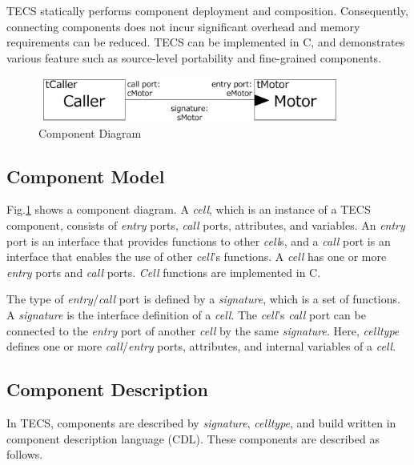 \documentclass[a4j,12pt,oneside,openany,english]{jsbook}
\begin{document}
TECS statically performs component deployment and composition.
Consequently, connecting components does not incur significant overhead and memory requirements can be reduced.
TECS can be implemented in C, and demonstrates various feature such as source-level portability and fine-grained components.

\begin{figure}[t]
    \centering
    \includegraphics[width=10cm,clip]{figure/component_diagram.pdf}
    \caption{Component Diagram}
    \label{fig:component}
\end{figure}

\subsection{Component Model}
Fig.\ref{fig:component} shows a component diagram.
A {\it cell}, which is an instance of a TECS component, consists of {\it entry} ports, {\it call} ports, attributes, and variables.
An {\it entry} port is an interface that provides functions to other {\it cell}s, and a {\it call} port is an interface that enables the use of other {\it cell}'s functions.
A {\it cell} has one or more {\it entry} ports and {\it call} ports.
{\it Cell} functions are implemented in C.

The type of {\it entry}/{\it call} port is defined by a {\it signature}, which is a set of functions.
A {\it signature} is the interface definition of a {\it cell}.
The {\it cell}'s  {\it call} port can be connected to the {\it entry} port of another {\it cell} by the same {\it signature}.
Here, {\it celltype} defines one or more {\it call}/{\it entry} ports, attributes, and internal variables of a {\it cell}.


\subsection{Component Description}
In TECS, components are described by {\it signature}, {\it celltype}, and build written in component description language (CDL).
These components are described as follows.
\end{document}
